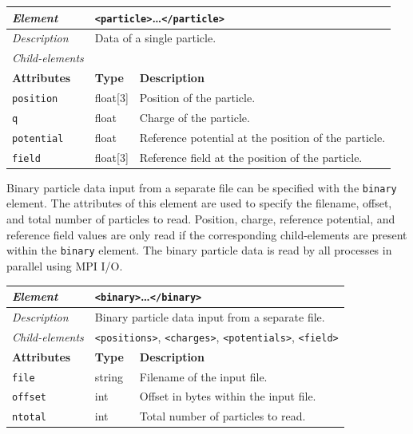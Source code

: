 \begin{center}
\small
\begin{tabular}{|p{3cm}|p{1.5cm}|p{8.5cm}|}
  \hline
  \textit{Element}        & \multicolumn{2}{p{10cm}|}{\texttt{<particle>}\dots\texttt{</particle>}} \\ \hline
  \textit{Description}    & \multicolumn{2}{p{10cm}|}{Data of a single particle.} \\ \hline
  \textit{Child-elements} \\ \hline
  \hline
  \textbf{Attributes}     & \textbf{Type} & \textbf{Description} \\ \hline
  \texttt{position}       & float[3]      & Position of the particle. \\ \hline
  \texttt{q}              & float         & Charge of the particle. \\ \hline
  \texttt{potential}      & float         & Reference potential at the position of the particle. \\ \hline
  \texttt{field}          & float[3]      & Reference field at the position of the particle. \\ \hline
\end{tabular}
\end{center}

\noindent
Binary particle data input from a separate file can be specified with the \texttt{binary} element.
The attributes of this element are used to specify the filename, offset, and total number of particles to read.
Position, charge, reference potential, and reference field values are only read if the corresponding child-elements are present within the \texttt{binary} element.
The binary particle data is read by all processes in parallel using MPI I/O.

\begin{center}
\small
\begin{tabular}{|p{3cm}|p{1.5cm}|p{8.5cm}|}
  \hline
  \textit{Element}        & \multicolumn{2}{p{10cm}|}{\texttt{<binary>}\dots\texttt{</binary>}} \\ \hline
  \textit{Description}    & \multicolumn{2}{p{10cm}|}{Binary particle data input from a separate file.} \\ \hline
  \textit{Child-elements} & \multicolumn{2}{p{10cm}|}{\texttt{<positions>}, \texttt{<charges>}, \texttt{<potentials>}, \texttt{<field>}} \\ \hline
  \hline
  \textbf{Attributes}     & \textbf{Type} & \textbf{Description} \\ \hline
  \texttt{file}           & string        & Filename of the input file. \\ \hline
  \texttt{offset}         & int           & Offset in bytes within the input file. \\ \hline
  \texttt{ntotal}         & int           & Total number of particles to read. \\ \hline
\end{tabular}
\end{center}


